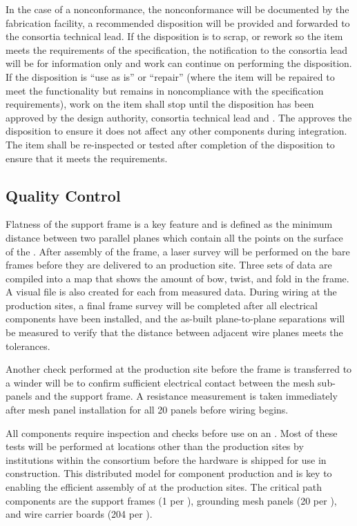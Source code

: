 In the case of a nonconformance, the nonconformance will be documented
by the fabrication facility, a recommended disposition will be
provided and forwarded to the consortia technical lead.  If the
disposition is to scrap, or rework so the item meets the requirements
of the specification, the notification to the consortia lead will be
for information only and work can continue on performing the
disposition.  If the disposition is ``use as is'' or ``repair'' (where the
item will be repaired to meet the functionality but remains in
noncompliance with the specification requirements), work on the item
shall stop until the disposition has been approved by the design
authority, consortia technical lead and .  The 
approves the disposition to ensure it does not affect any
other  components during integration. The item shall be
re-inspected or tested after completion of the disposition to ensure
that it meets the requirements.

\subsection{ Quality Control}

Flatness of the  support frame is a key feature and is
defined as the minimum distance between two parallel planes which
contain all the points on the surface of the . After
assembly of the  frame, a laser survey will be performed on
the bare frames before they are delivered to an 
production site. Three sets of data are compiled into a map that shows
the amount of bow, twist, and fold in the frame. A visual file is also
created for each  from measured data. During 
wiring at the production sites, a final frame survey will be completed
after all electrical components have been installed, and the as-built
plane-to-plane separations will be measured to verify that the
distance between adjacent wire planes meets the tolerances.

Another check performed at the  production site before the
frame is transferred to a winder will be to confirm sufficient
electrical contact between the mesh sub-panels and the 
support frame. A resistance measurement is taken immediately after
mesh panel installation for all 20 panels before wiring begins.

All components require inspection and  checks before use on an
. Most of these tests will be performed at locations other than the
 production sites by institutions within the consortium before the
hardware is shipped for use in  construction. This distributed
model for component production and  is key to enabling the efficient
assembly of  at the production sites. The critical path components
are the support frames (1 per ), grounding mesh panels (20 per
), and wire carrier boards (204 per ).

